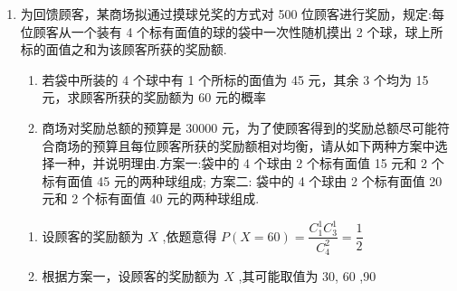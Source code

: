 \begin{enumerate}
\begin{enumerate}
\begin{jieda}
\begin{enumerate}
\begin{center}
                \end{center}

                \item 由 (1) 可得$E\left( X\right)  = {10} \times  {0.5} + 9 \times  {0.3} + 8 \times  {0.1} + 7 \times  {0.1} = {9.2}$ (环)，$E\left( Y\right)  = {10} \times  {0.3} + 9 \times  {0.3} + 8 \times  {0.2} + 7 \times  {0.2} = {8.7}$ (环),
                
                $D\left( X\right)  = {\left( {10} - {9.2}\right) }^{2} \times  {0.5} + {\left( 9 - {9.2}\right) }^{2} \times  {0.3} + {\left( 8 - {9.2}\right) }^{2} \times  {0.1} + {\left( 7 - {9.2}\right) }^{2} \times  {0.1} = {0.96}$ ,
                
                $D\left( Y\right)  = {\left( {10} - {8.7}\right) }^{2} \times  {0.3} + {\left( 9 - {8.7}\right) }^{2} \times  {0.3} + {\left( 8 - {8.7}\right) }^{2} \times  {0.2} + {\left( 7 - {8.7}\right) }^{2} \times  {0.2} = {1.21}$ ,
                
                由于 $E\left( X\right)  > E\left( Y\right)$ ,说明甲平均射中的环数比乙高，又因为 $D\left( X\right)  < D\left( Y\right)$ ,说明甲射中的环数比乙集中,比较稳定，所以，甲比乙的技术好，故应选拔甲射手参加奥运会.
            \end{enumerate}
        \end{jieda}
        \item 为回馈顾客，某商场拟通过摸球兑奖的方式对 500 位顾客进行奖励，规定:每位顾客从一个装有 4 个标有面值的球的袋中一次性随机摸出 2 个球，球上所标的面值之和为该顾客所获的奖励额.
        \begin{enumerate}
            \item 若袋中所装的 4 个球中有 1 个所标的面值为 45 元，其余 3 个均为 15 元，求顾客所获的奖励额为 60 元的概率
            \item 商场对奖励总额的预算是 30000 元，为了使顾客得到的奖励总额尽可能符合商场的预算且每位顾客所获的奖励额相对均衡，请从如下两种方案中选择一种，并说明理由.方案一:袋中的 4 个球由 2 个标有面值 15 元和 2 个标有面值 45 元的两种球组成; 方案二: 袋中的 4 个球由 2 个标有面值 20 元和 2 个标有面值 40 元的两种球组成.
        \end{enumerate}
        \begin{jieda}
            \begin{enumerate}
                \item 设顾客的奖励额为 $X$ ,依题意得 $P\left( {X = {60}}\right)  = \dfrac{C_{1}^{1}C_{3}^{1}}{C_{4}^{2}} = \dfrac{1}{2}$
                \item 根据方案一，设顾客的奖励额为 $X$ ,其可能取值为 30, 60 ,90
                

\end{enumerate}
\end{jieda}
\end{enumerate}
\end{enumerate}
